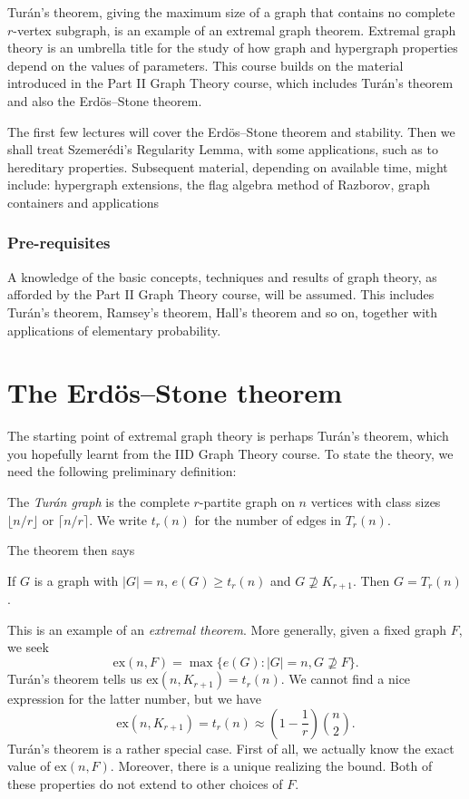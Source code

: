 \documentclass[a4paper]{article}
\renewcommand\ex{\mathrm{ex}}
\begin{document}
\maketitle
{\small
\setlength{\parindent}{0em}
\setlength{\parskip}{1em}
Tur\'an's theorem, giving the maximum size of a graph that contains no complete $r$-vertex subgraph, is an example of an extremal graph theorem. Extremal graph theory is an umbrella title for the study of how graph and hypergraph properties depend on the values of parameters. This course builds on the material introduced in the Part II Graph Theory course, which includes Tur\'an's theorem and also the Erd\"os--Stone theorem.

The first few lectures will cover the Erd\"os--Stone theorem and stability. Then we shall treat Szemer\'edi's Regularity Lemma, with some applications, such as to hereditary properties. Subsequent material, depending on available time, might include: hypergraph extensions, the flag algebra method of Razborov, graph containers and applications

\subsubsection*{Pre-requisites}
A knowledge of the basic concepts, techniques and results of graph theory, as afforded by the Part II Graph Theory course, will be assumed. This includes Tur\'an's theorem, Ramsey's theorem, Hall's theorem and so on, together with applications of elementary probability.
}
\tableofcontents

\section{The \texorpdfstring{Erd\"os--Stone}{Erdos--Stone} theorem}
The starting point of extremal graph theory is perhaps Tur\'an's theorem, which you hopefully learnt from the IID Graph Theory course. To state the theory, we need the following preliminary definition:
\begin{defi}
  The \emph{Tur\'an graph}  is the complete $r$-partite graph on $n$ vertices with class sizes $\lfloor n/r\rfloor$ or $\lceil n/r\rceil$. We write $t_r(n)$ for the number of edges in $T_r(n)$.
\end{defi}

The theorem then says
\begin{thm}
  If $G$ is a graph with $|G| = n$, $e(G) \geq t_r(n)$ and $G \not \supseteq K_{r+1}$. Then $G = T_r(n)$.
\end{thm}
This is an example of an \emph{extremal theorem}. More generally, given a fixed graph $F$, we seek
\[
  \ex(n, F) = \max \{e(G): |G| = n, G \not\supseteq F\}.
\]
Tur\'an's theorem tells us $\ex(n, K_{r + 1}) = t_r(n)$. We cannot find a nice expression for the latter number, but we have
\[
  \ex(n, K_{r + 1}) = t_r(n) \approx \left(1 - \frac{1}{r}\right)\binom{n}{2}.
\]
Tur\'an's theorem is a rather special case. First of all, we actually know the exact value of $\ex(n, F)$. Moreover, there is a unique  realizing the bound. Both of these properties do not extend to other choices of $F$.
\end{document}

